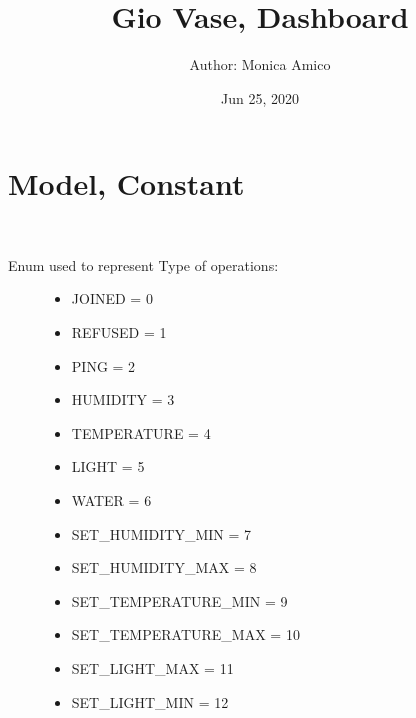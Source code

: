 \documentclass[letterpaper,10pt,english]{sphinxmanual}
\title{Gio Vase, Dashboard}
\date{Jun 25, 2020}
\author{Author: Monica Amico}
\begin{document}
\pagestyle{empty}
\sphinxmaketitle
\pagestyle{plain}
\sphinxtableofcontents
\pagestyle{normal}
\label{\detokenize{index::doc}}



\chapter{Model, Constant}
\label{\detokenize{index:module-model.constant}}\label{\detokenize{index:model-constant}}

\begin{fulllineitems}
\label{\detokenize{index:model.constant.Operation}}~\begin{description}
\item[{Enum used to represent Type of operations:}] \leavevmode\begin{itemize}
\item {} 
JOINED = 0

\item {} 
REFUSED = 1

\item {} 
PING = 2

\item {} 
HUMIDITY = 3

\item {} 
TEMPERATURE = 4

\item {} 
LIGHT = 5

\item {} 
WATER = 6

\item {} 
SET\_HUMIDITY\_MIN = 7

\item {} 
SET\_HUMIDITY\_MAX = 8

\item {} 
SET\_TEMPERATURE\_MIN = 9

\item {} 
SET\_TEMPERATURE\_MAX = 10

\item {} 
SET\_LIGHT\_MAX = 11

\item {} 
SET\_LIGHT\_MIN = 12


\end{itemize}
\end{description}
\end{fulllineitems}
\end{document}
